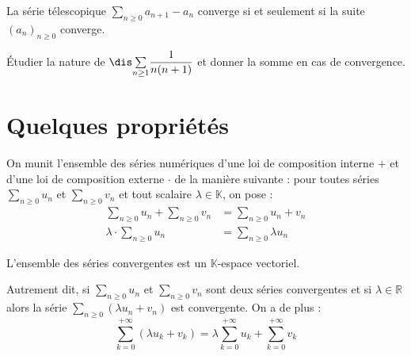 \documentclass[french,11pt,twoside]{VcCours}
\newcommand{\Sum}[2]{\ensuremath{\textstyle{\sum\limits_{#1}^{#2}}}}
\begin{document}
\begin{prop}
La série télescopique $\Sum{n\geq 0}{} a_{n+1}-a_n$ converge si et seulement si la suite $(a_n)_{n \geq 0}$ converge.
\end{prop}

\begin{preuve} 
\vspace{3cm}
\end{preuve}

\medskip

\begin{exa} Étudier la nature de $\dis \Sum{n\geq 1}{} \dfrac{1}{n(n+1)}$ et donner la somme en cas de convergence.

%
\end{exa}


\section{Quelques propriétés}

On munit l'ensemble des séries numériques d'une loi de composition interne $+$ et d'une loi de composition externe $\cdot$ de la manière suivante : pour toutes séries $\Sum{n \geq 0}{} u_n$ et $\Sum{n \geq 0}{} v_n$ et tout scalaire $\lambda \in \mathbb{K}$, on pose :
\begin{align*}
\Sum{n \geq 0}{} u_n + \Sum{n \geq 0}{} v_n  & = \Sum{n \geq 0}{} u_n+v_n \\
\lambda \cdot \Sum{n \geq 0}{} u_n & = \Sum{n \geq 0}{} \lambda u_n
\end{align*}



\begin{prop}
L'ensemble des séries convergentes est un $\mathbb{K}$-espace vectoriel.

Autrement dit, si $\Sum{n \geq 0}{} u_n$ et $\Sum{n \geq 0}{} v_n$ sont deux séries convergentes et si $\lambda \in \mathbb{R}$ alors la série $\Sum{n \geq 0}{} (\lambda u_n +v_n)$ est convergente. On a de plus : 
$$ \sum_{k=0}^{+ \infty} (\lambda u_k + v_k) = \lambda  \sum_{k=0}^{+ \infty}  u_k +  \sum_{k=0}^{+ \infty}  v_k$$
\end{prop}
\end{document}
